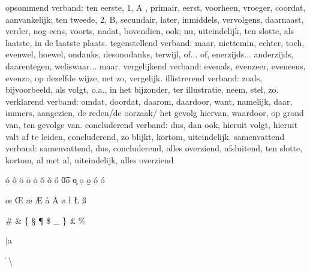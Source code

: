 opsommend verband: ten eerste, 1, A , primair, eerst, voorheen, vroeger, coordat, aanvankelijk; ten tweede, 2, B, secundair, later, inmiddels, vervolgens, daarnaast, verder, nog eens, voorts, nadat, bovendien, ook; nu, uiteindelijk, ten slotte, als laatste, in de laatste plaats.
tegenstellend verband: maar, niettemin, echter, toch, evenwel, hoewel, ondanks, desonodanks, terwijl, of... of, enerzijds... anderzijds, daarentegen, weliswaar... maar.
vergelijkend verband: evenals, evenzeer, eveneens, evenzo, op dezelfde wijze, net zo, vergelijk.
illistrerend verband: zoals, bijvoorbeeld, als volgt, o.a., in het bijzonder, ter illustratie, neem, stel, zo.
verklarend verband: omdat, doordat, daarom, daardoor, want, namelijk, daar, immers, aangezien, de reden/de oorzaak/ het gevolg hiervan, waardoor, op grond van, ten gevolge van.
concluderend verband: dus, dan ook, hieruit volgt, hieruit valt af te leiden, concluderend, zo blijkt, kortom, uiteindelijk.
samenvattend verband: samenvattend, dus, concluderend, alles overziend, afsluitend, ten slotte, kortom, al met al, uiteindelijk, alles overziend







\degree
\lesssim
\arcmin
\fh
\fdg
\fp
\sun
\gtrsim
\arcsec
\fm
\farcm
\micron
\earh
\sq
\fd
\fs
\farcs
\'{o}
\^{o}
\"{o}
\={o}
\.{o}
\u{o}
\v{o}
\H{o}
\t{0o}
\c{o}
\d{o}
\b{o}
\'{o}
\'{o}

\oe
\OE
\ae
\AE
\aa
\AA
\o
\0
\l
\L
\ss



\dag
\ddag
\#
\&
\{
\S
\P
\$
\_
\}
\copywright
\pounds
\%


\bar{a}

\alpha
\beta
\gamma
\delta
\epsilon
\zeta
\eta
\theta
\iota
\kappa
\lambda
\mu
\nu
\xi
\pi
\rho
\sigma
\tau
\upsilon
\phi
\chi
\psi
\omega



\varepsilon
\vartheta
\varrho
\varsigma
\varphi

\Gamma
\Delta
\Theta
\Lambda
\Xi
\Pi
\Sigma
\Upsilon
\Phi
\Psi
\Omega

\pm
\mp
\setminus
\cdot
\times\ast
\start\diamond
\circ
\bullet
\div
\lhd
\vee
\wedge
\oplus
\ominus
\otimes
\oslash
\capacity\cup
\uplus
\aqcap
\sqcap
\aqcup
\triangleleft
\triangleright
\wr
\bigcirc
\bigtriangleup
\bigtriangledown
\rhd
\odot
\dagger
\ddagger
\amalg
\unlhd
\unrhd


\leq



\sum
\prod
\coprod
\int
\oint
\bigodot
\bigoplus
\bigcap
\bigcup
\bigsqcup
\bigvee
\bigwedge
\bigotimes
\biguplus



\aleph
\hbar
\imath
\jmath
\ell
\wp
\Re
\Im
\partial
\infty
\Box
\forall
\artists
\neg
\flat
\natural
\mho
\prime
\emptyset
\nabla
\surd
\top
\bot
\|
\angle
\triangle
\backslash
\Diamond
\sharp
\clubsuit
\diamondsuit
\heartsuit
\spadesuit





\cong